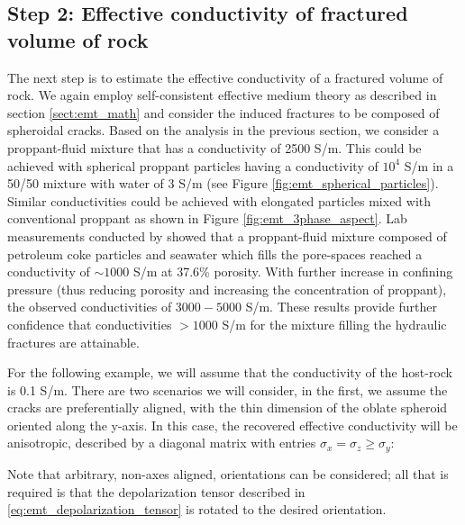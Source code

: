 \subsection{Step 2: Effective conductivity of fractured volume of rock}
The next step is to estimate the effective conductivity of a fractured volume of rock. We again employ self-consistent effective medium theory as described in section \ref{sect:emt_math} and consider the induced fractures to be composed of spheroidal cracks. Based on the analysis in the previous section, we consider a proppant-fluid mixture that has a conductivity of 2500 S/m. This could be achieved with spherical proppant particles having a conductivity of $10^4$ S/m in a 50/50 mixture with water of 3 S/m (see Figure \ref{fig:emt_spherical_particles}). Similar conductivities could be achieved with elongated particles mixed with conventional proppant as shown in Figure \ref{fig:emt_3phase_aspect}. Lab measurements conducted by \cite{Zhang2016} showed that a proppant-fluid mixture composed of petroleum coke particles and seawater which fills the pore-spaces reached a conductivity of $\sim 1000$ S/m at 37.6\% porosity. With further increase in confining pressure (thus reducing porosity and increasing the concentration of proppant), the observed conductivities of $3000 - 5000$ S/m. These results provide further confidence that conductivities $> 1000$ S/m for the mixture filling the hydraulic fractures are attainable.


For the following example, we will assume that the conductivity of the host-rock is 0.1 S/m. There are two scenarios we will consider, in the first, we assume the cracks are preferentially aligned, with the thin dimension of the oblate spheroid oriented along the y-axis. In this case, the recovered effective conductivity will be anisotropic, described by a diagonal matrix with entries $\sigma_x = \sigma_z \geq \sigma_y:$

Note that arbitrary, non-axes aligned, orientations can be considered; all that is required is that the depolarization tensor described in \ref{eq:emt_depolarization_tensor} is rotated to the desired orientation.

